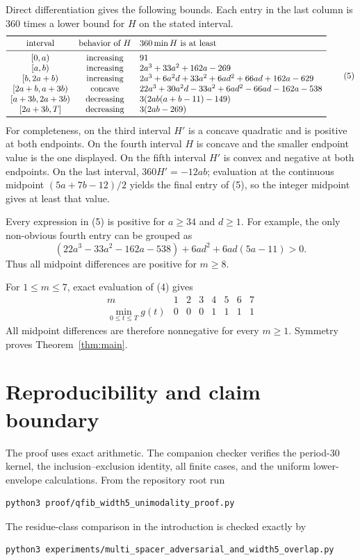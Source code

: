 \documentclass[11pt]{article}
\begin{document}
Direct differentiation gives the following bounds.  Each entry in the last
column is \(360\) times a lower bound for \(H\) on the stated interval.
\[
\begin{array}{ccl}
\toprule
\text{interval}&\text{behavior of }H&360\min H\text{ is at least}\\
\midrule
{}[0,a)&\text{increasing}&91\\
{}[a,b)&\text{increasing}&2a^3+33a^2+162a-269\\
{}[b,2a+b)&\text{increasing}&
2a^3+6a^2d+33a^2+6ad^2+66ad+162a-629\\
{}[2a+b,a+3b)&\text{concave}&
22a^3+30a^2d-33a^2+6ad^2-66ad-162a-538\\
{}[a+3b,2a+3b)&\text{decreasing}&3(2ab(a+b-11)-149)\\
{}[2a+3b,T]&\text{decreasing}&3(2ab-269)\\
\bottomrule
\end{array} \tag{5}
\]
For completeness, on the third interval \(H'\) is a concave quadratic and
is positive at both endpoints.  On the fourth interval \(H\) is concave and
the smaller endpoint value is the one displayed.  On the fifth interval
\(H'\) is convex and negative at both endpoints.  On the last interval,
\(360H'=-12ab\); evaluation at the continuous midpoint
\((5a+7b-12)/2\) yields the final entry of (5), so the integer midpoint gives
at least that value.

Every expression in (5) is positive for \(a\geq34\) and \(d\geq1\).  For
example, the only non-obvious fourth entry can be grouped as
\[
(22a^3-33a^2-162a-538)+6ad^2+6ad(5a-11)>0.
\]
Thus all midpoint differences are positive for \(m\geq8\).

For \(1\leq m\leq7\), exact evaluation of (4) gives
\[
\begin{array}{c|rrrrrrr}
m&1&2&3&4&5&6&7\\ \hline
\min_{0\leq t\leq T}g(t)&0&0&0&1&1&1&1
\end{array}
\]
All midpoint differences are therefore nonnegative for every \(m\geq1\).
Symmetry proves Theorem~\ref{thm:main}.

\section{Reproducibility and claim boundary}

The proof uses exact arithmetic.  The companion checker verifies the
period-30 kernel, the inclusion--exclusion identity, all finite cases, and
the uniform lower-envelope calculations.  From the repository root run
\begin{verbatim}
python3 proof/qfib_width5_unimodality_proof.py
\end{verbatim}
The residue-class comparison in the introduction is checked exactly by
\begin{verbatim}
python3 experiments/multi_spacer_adversarial_and_width5_overlap.py
\end{verbatim}
\end{document}
